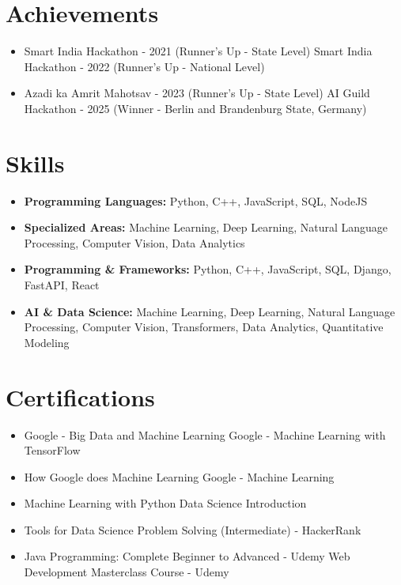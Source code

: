 \documentclass[a4paper,10pt]{article}
\begin{document}
\section*{Achievements}
\begin{itemize}
\item Smart India Hackathon - 2021 (Runner's Up - State Level) \hfill Smart India Hackathon - 2022 (Runner's Up - National Level)
\item Azadi ka Amrit Mahotsav - 2023 (Runner's Up - State Level) \hfill AI Guild Hackathon - 2025 (Winner - Berlin and Brandenburg State, Germany)
\end{itemize}

\section*{Skills}
\begin{itemize}
  \item \textbf{Programming Languages:} Python, C++, JavaScript, SQL, NodeJS
  \item \textbf{Specialized Areas:} Machine Learning, Deep Learning, Natural Language Processing, Computer Vision, Data Analytics
  \item \textbf{Programming \& Frameworks:} Python, C++, JavaScript, SQL, Django, FastAPI, React
  \item \textbf{AI \& Data Science:} Machine Learning, Deep Learning, Natural Language Processing, Computer Vision, Transformers, Data Analytics, Quantitative Modeling
\end{itemize}

\section*{Certifications}
\begin{itemize}
\item Google - Big Data and Machine Learning \hfill Google - Machine Learning with TensorFlow
\item How Google does Machine Learning \hfill Google - Machine Learning
\item Machine Learning with Python \hfill Data Science Introduction
\item Tools for Data Science \hfill Problem Solving (Intermediate) - HackerRank
\item Java Programming: Complete Beginner to Advanced - Udemy \hfill Web Development Masterclass Course - Udemy
\end{itemize}
\end{document}
